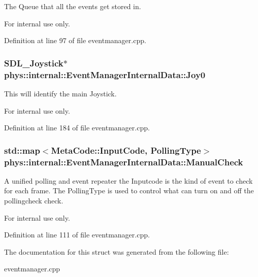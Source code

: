 The Queue that all the events get stored in. 

\begin{DoxyInternal}{For internal use only.}
\end{DoxyInternal}


Definition at line 97 of file eventmanager.cpp.

\hypertarget{structphys_1_1internal_1_1EventManagerInternalData_aafd32b9b23cb2121bd268e3c56a3f46e}{
\subsubsection[{Joy0}]{\setlength{\rightskip}{0pt plus 5cm}SDL\_\-Joystick$\ast$ {\bf phys::internal::EventManagerInternalData::Joy0}}}
\label{d6/d3a/structphys_1_1internal_1_1EventManagerInternalData_aafd32b9b23cb2121bd268e3c56a3f46e}


This will identify the main Joystick. 

\begin{DoxyInternal}{For internal use only.}
\end{DoxyInternal}


Definition at line 184 of file eventmanager.cpp.

\hypertarget{structphys_1_1internal_1_1EventManagerInternalData_a717396b1782d7f491e0f085643507639}{
\subsubsection[{ManualCheck}]{\setlength{\rightskip}{0pt plus 5cm}std::map$<${\bf MetaCode::InputCode}, {\bf PollingType}$>$ {\bf phys::internal::EventManagerInternalData::ManualCheck}}}
\label{d6/d3a/structphys_1_1internal_1_1EventManagerInternalData_a717396b1782d7f491e0f085643507639}


A unified polling and event repeater the Inputcode is the kind of event to check for each frame. The PollingType is used to control what can turn on and off the pollingcheck check. 

\begin{DoxyInternal}{For internal use only.}
\end{DoxyInternal}


Definition at line 111 of file eventmanager.cpp.



The documentation for this struct was generated from the following file:\begin{DoxyCompactItemize}
\item 
eventmanager.cpp\end{DoxyCompactItemize}

